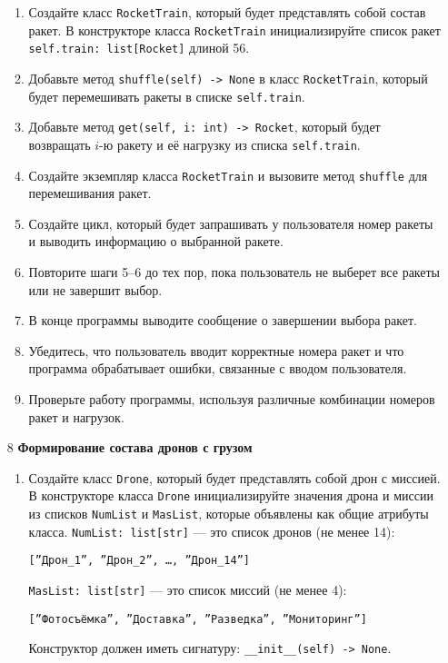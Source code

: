 \begin{enumerate}
\begin{enumerate}
    \item Создайте класс \texttt{RocketTrain}, который будет представлять собой состав ракет. В конструкторе класса \texttt{RocketTrain} инициализируйте список ракет \texttt{self.train: list[Rocket]} длиной 56.

    \item Добавьте метод \texttt{shuffle(self) -> None} в класс \texttt{RocketTrain}, который будет перемешивать ракеты в списке \texttt{self.train}.

    \item Добавьте метод \texttt{get(self, i: int) -> Rocket}, который будет возвращать $i$-ю ракету и её нагрузку из списка \texttt{self.train}.

    \item Создайте экземпляр класса \texttt{RocketTrain} и вызовите метод \texttt{shuffle} для перемешивания ракет.

    \item Создайте цикл, который будет запрашивать у пользователя номер ракеты и выводить информацию о выбранной ракете.

    \item Повторите шаги 5–6 до тех пор, пока пользователь не выберет все ракеты или не завершит выбор.

    \item В конце программы выводите сообщение о завершении выбора ракет.

    \item Убедитесь, что пользователь вводит корректные номера ракет и что программа обрабатывает ошибки, связанные с вводом пользователя.

    \item Проверьте работу программы, используя различные комбинации номеров ракет и нагрузок.
\end{enumerate}

\item[8] \textbf{Формирование состава дронов с грузом}
\begin{enumerate}
    \item Создайте класс \texttt{Drone}, который будет представлять собой дрон с миссией. В конструкторе класса \texttt{Drone} инициализируйте значения дрона и миссии из списков \texttt{NumList} и \texttt{MasList}, которые объявлены как общие атрибуты класса. \texttt{NumList: list[str]} — это список дронов (не менее 14): 
    \begin{center}
        \texttt{[''Дрон\_1'', ''Дрон\_2'', \dots, ''Дрон\_14'']}
    \end{center}
    \texttt{MasList: list[str]} — это список миссий (не менее 4):
    \begin{center}
        \texttt{[''Фотосъёмка'', ''Доставка'', ''Разведка'', ''Мониторинг'']}
    \end{center}
    Конструктор должен иметь сигнатуру: \texttt{\_\_init\_\_(self) -> None}.


\end{enumerate}
\end{enumerate}
